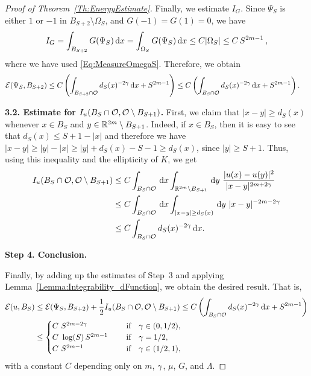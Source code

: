 \begin{proof}[Proof of Theorem~\ref{Th:EnergyEstimate}]
Finally, we estimate $I_G$. Since $\Psi_S$ is either $1$ or $-1$ in $B_{S+2}\setminus \Omega_S$, and $G(-1)=G(1)=0$, we have
\begin{align*}
I_G = \int_{B_{S+2}} G(\Psi_S) \,\mathrm{d} x= \int_{\Omega_S} G(\Psi_S)\,\mathrm{d} x \leq C | \Omega_S| \leq C\,S^{2m-1}\,,
\end{align*}
where we have used \eqref{Eq:MeasureOmegaS}. Therefore, we obtain
\begin{align*}
\mathcal{E}(\Psi_S,B_{S+2}) &\leq C \left(\int_{B_{S+2} \cap \mathcal{O}} d_S(x)^{-2\gamma} \,\mathrm{d} x + S^{2m-1} \right)\leq C\left(\int_{B_{S} \cap \mathcal{O}} d_S(x)^{-2\gamma} \,\mathrm{d} x + S^{2m-1} \right).
\end{align*}


\textbf{3.2. Estimate for $I_u(B_S \cap \mathcal{O}, \mathcal{O} \setminus B_{S+1})$.} First, we claim that $|x-y|\geq d_S(x)$ whenever $x\in B_S$ and $y\in \mathbb{R}^{2m}\setminus B_{S+1}$. Indeed, if $x\in B_S$, then it is easy to see that $d_S(x) \leq S+1-|x|$ and therefore we have $|x-y|\geq |y|-|x|\geq |y|+d_S(x)-S-1 \geq  d_S(x)$, since $|y| \geq S+1$. Thus, using this inequality and the ellipticity of $K$, we get
\begin{align*}
I_u(B_S \cap \ocal, \ocal \setminus B_{S+1}) &\leq C \int_{B_S \cap \ocal} \d x \int_{\R^{2m}\setminus B_{S+1}} \d y \ \frac{|u(x)-u(y)|^2}{|x-y|^{2m+2\s}} \\
& \leq C \int_{B_S \cap \ocal} \d x \int_{|x-y|\geq d_S(x)} \d y \ |x-y|^{-2m-2\s} \\
&\leq C \int_{B_S \cap \ocal} d_S(x)^{-2\s} \d x.
\end{align*}

\textbf{Step 4. Conclusion.}

Finally, by adding up the estimates of Step~3 and applying Lemma~\ref{Lemma:Integrability_dFunction}, we obtain the desired result. That is,
\begin{align*}
\mathcal{E}(u,B_S) &\leq \mathcal{E}(\Psi_S,B_{S+2}) +  \frac{1}{2}I_u(B_S \cap \mathcal{O}, \mathcal{O} \setminus B_{S+1}) \leq C\left(\int_{B_S \cap \mathcal{O}} d_S(x)^{-2\gamma} \,\mathrm{d} x + S^{2m-1} \right)\\
&\leq \begin{cases}
C \ S^{2m-2\gamma}\ \ \ &\textrm{if } \ \ \gamma\in(0,1/2),\\
C\ \log(S)\,S^{2m-1}\ \ \ \ &\textrm{if } \ \ \gamma=1/2,\\
C \ S^{2m-1}\ \ \ \ &\textrm{if } \ \ \gamma\in(1/2,1),\\
\end{cases}
\end{align*}
with a constant $C$ depending only on $m$, $\gamma$, $\mu$, $G$, and $\Lambda$. 


\end{proof}
